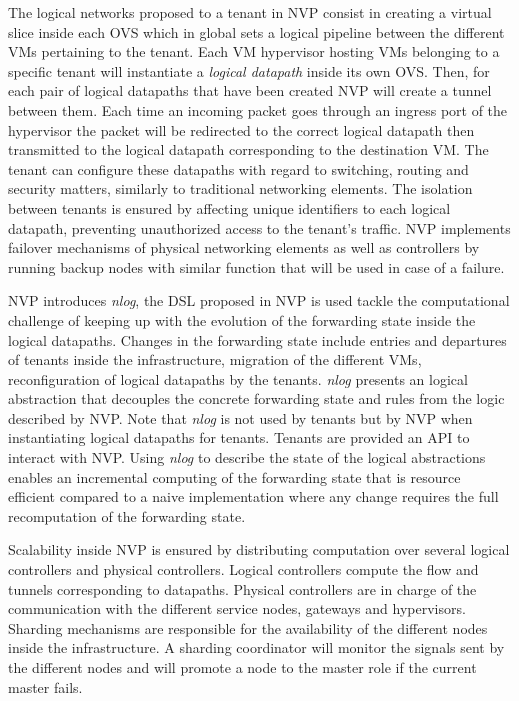 The logical networks proposed to a tenant in NVP consist in creating a virtual slice inside each OVS which in global sets a logical pipeline between the different VMs pertaining to the tenant.
Each VM hypervisor hosting VMs belonging to a specific tenant will instantiate a \textit{logical datapath} inside its own OVS. 
Then, for each pair of logical datapaths that have been created NVP will create a tunnel between them.
Each time an incoming packet goes through an ingress port of the hypervisor the packet will be redirected to the correct logical datapath then transmitted to the logical datapath corresponding to the destination VM.
The tenant can configure these datapaths with regard to switching, routing and security matters, similarly to traditional networking elements.
The isolation between tenants is ensured by affecting unique identifiers to each logical datapath, preventing unauthorized access to the tenant's traffic.
NVP implements failover mechanisms of physical networking elements as well as controllers by running backup nodes with similar function that will be used in case of a failure.

NVP introduces \textit{nlog}, the DSL proposed in NVP is used tackle the computational challenge of keeping up with the evolution of the forwarding state inside the logical datapaths. Changes in the forwarding state include entries and departures of tenants inside the infrastructure, migration of the different VMs, reconfiguration of logical datapaths by the tenants. \textit{nlog} presents an logical abstraction that decouples the concrete forwarding state and rules from the logic described by NVP. Note that \textit{nlog} is not used by tenants but by NVP when instantiating logical datapaths for tenants.
Tenants are provided an API to interact with NVP.
Using \textit{nlog} to describe the state of the logical abstractions enables an incremental computing of the forwarding state that is resource efficient compared to a naive implementation where any change requires the full recomputation of the forwarding state.

Scalability inside NVP is ensured by distributing computation over several logical controllers and physical controllers. Logical controllers compute the flow and tunnels corresponding to datapaths. Physical controllers are in charge of the communication with the different service nodes, gateways and hypervisors.
Sharding mechanisms are responsible for the availability of the different nodes inside the infrastructure. A sharding coordinator will monitor the signals sent by the different nodes and will promote a node to the master role if the current master fails.

